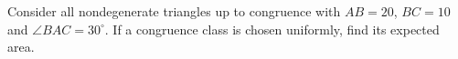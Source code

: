 Consider all nondegenerate triangles up to congruence with $AB=20$, $BC=10$ and $\angle BAC=30^\circ$. If a congruence class is chosen uniformly, find its expected area.
